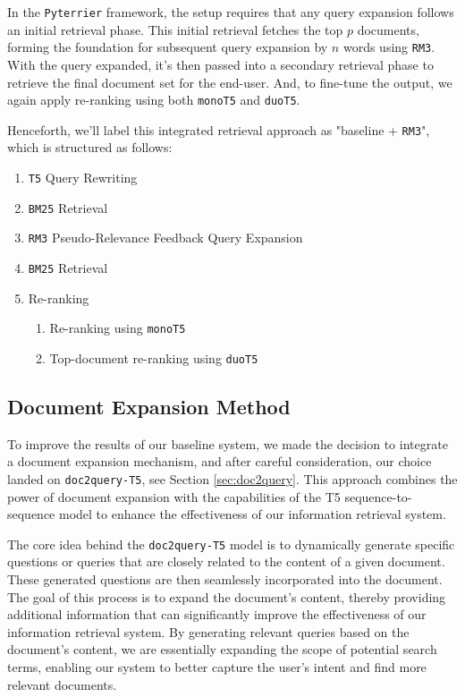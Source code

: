 \documentclass[sigconf]{acmart}
\begin{document}
In the \texttt{Pyterrier} framework, the setup requires that any query expansion follows an initial retrieval phase. This initial retrieval fetches the top $p$ documents, forming the foundation for subsequent query expansion by $n$ words using \texttt{RM3}. With the query expanded, it's then passed into a secondary retrieval phase to retrieve the final document set for the end-user. And, to fine-tune the output, we again apply re-ranking using both \texttt{monoT5} and \texttt{duoT5}.

Henceforth, we'll label this integrated retrieval approach as "baseline + \texttt{RM3}", which is structured as follows:
\begin{enumerate}
	\item	\texttt{T5} Query Rewriting
	\item	\texttt{BM25} Retrieval
	\item	\texttt{RM3} Pseudo-Relevance Feedback Query Expansion
	\item	\texttt{BM25} Retrieval
	\item	Re-ranking
			\begin{enumerate}
				\item	Re-ranking using \texttt{monoT5}
				\item	Top-document re-ranking using \texttt{duoT5}
			\end{enumerate}
\end{enumerate}

\subsection{Document Expansion Method}\label{sec:doc2query-method}
To improve the results of our baseline system, we made the decision to integrate a document expansion mechanism, and after careful consideration, our choice landed on \texttt{doc2query-T5}, see Section \ref{sec:doc2query}. This approach combines the power of document expansion with the capabilities of the T5 sequence-to-sequence model to enhance the effectiveness of our information retrieval system.

The core idea behind the \texttt{doc2query-T5} model is to dynamically generate specific questions or queries that are closely related to the content of a given document. These generated questions are then seamlessly incorporated into the document. The goal of this process is to expand the document's content, thereby providing additional information that can significantly improve the effectiveness of our information retrieval system. By generating relevant queries based on the document's content, we are essentially expanding the scope of potential search terms, enabling our system to better capture the user's intent and find more relevant documents.
\end{document}
